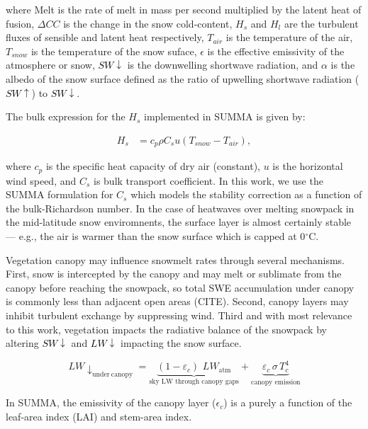 \documentclass[12pt]{iopjournal}
\newcommand{\lwdn}{\textcolor{black}{$LW\downarrow$}\xspace}
\newcommand{\swdn}{\textcolor{black}{$SW\downarrow$}\xspace}
\newcommand{\swup}{\textcolor{black}{$SW\uparrow$}\xspace}
\begin{document}
where Melt is the rate of melt in mass per second multiplied by the latent heat of fusion, $\Delta CC$ is the change in the snow cold-content, $H_s$ and $H_l$ are the turbulent fluxes of sensible and latent heat respectively, $T_{air}$ is the temperature of the air, $T_{snow}$ is the temperature of the snow suface, $\epsilon$ is the effective emissivity of the atmosphere or snow, \swdn is the downwelling shortwave radiation, and $\alpha$ is the albedo of the snow surface defined as the ratio of upwelling shortwave radiation (\swup) to \swdn. 

The bulk expression for the $H_s$ implemented in SUMMA is given by: 

\begin{align} 
H_s &=  c_p \rho C_s u (T_{snow} - T_{air}) \label{eq:bulk2}, 
\end{align}

where $c_p$ is the specific heat capacity of dry air (constant), $u$ is the horizontal wind speed, and $C_s$ is bulk transport coefficient. 
In this work, we use the SUMMA formulation for $C_s$ which models the stability correction as a function of the bulk-Richardson number.
In the case of heatwaves over melting snowpack in the mid-latitude snow enviromnents, the surface layer is almost certainly stable --- e.g., the air is warmer than the snow surface which is capped at 0$^\circ$C.


Vegetation canopy may influence snowmelt rates through several mechanisms. 
First, snow is intercepted by the canopy and may melt or sublimate from the canopy before reaching the snowpack, so total SWE accumulation under canopy is commonly less than adjacent open areas (CITE). 
Second, canopy layers may inhibit turbulent exchange by suppressing wind. 
Third and with most relevance to this work, vegetation impacts the radiative balance of the snowpack by altering \swdn and \lwdn impacting the snow surface.


\begin{equation}\label{eq:canopy_lw}
LW\downarrow_{\mathrm{under\ canopy}} = \underbrace{(1 - \varepsilon_c)\,\,LW_{\text{atm}}}_{\text{sky LW through canopy gaps}} 
+ \underbrace{\varepsilon_c\,\sigma\,T_c^4}_{\text{canopy emission}}
\end{equation}

In SUMMA, the emissivity of the canopy layer ($\epsilon_c$) is a purely a function of the leaf-area index (LAI) and stem-area index. 
\end{document}
